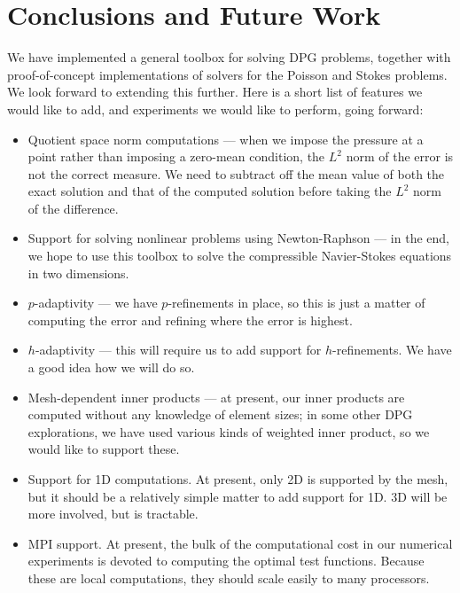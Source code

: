 \section{Conclusions and Future Work}\label{NVR:sec:conclusion}
We have implemented a general toolbox for solving DPG problems, together with proof-of-concept implementations of solvers for the Poisson and Stokes problems.  We look forward to extending this further.  Here is a short list of features we would like to add, and experiments we would like to perform, going forward:
\begin{itemize}
\item Quotient space norm computations --- when we impose the pressure at a point rather than imposing a zero-mean condition, the $L^{2}$ norm of the error is not the correct measure.  We need to subtract off the mean value of both the exact solution and that of the computed solution before taking the $L^{2}$ norm of the difference.
\item Support for solving nonlinear problems using Newton-Raphson --- in the end, we hope to use this toolbox to solve the compressible Navier-Stokes equations in two dimensions.
\item $p$-adaptivity --- we have $p$-refinements in place, so this is just a matter of computing the error and refining where the error is highest.
\item $h$-adaptivity --- this will require us to add support for $h$-refinements.  We have a good idea how we will do so.
\item Mesh-dependent inner products --- at present, our inner products are computed without any knowledge of element sizes; in some other DPG explorations, we have used various kinds of weighted inner product, so we would like to support these.
\item Support for 1D computations.  At present, only 2D is supported by the mesh, but it should be a relatively simple matter to add support for 1D.  3D will be more involved, but is tractable.
\item MPI support.  At present, the bulk of the computational cost in our numerical experiments is devoted to computing the optimal test functions.  Because these are local computations, they should scale easily to many processors.
\end{itemize}






